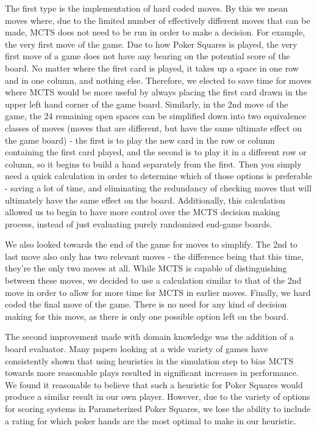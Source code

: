 \documentclass[letterpaper]{article}
\begin{document}
The first type is the implementation of hard coded moves. By this we mean moves where, due to the limited number of effectively different moves that can be made, MCTS does not need to be run in order to make a decision. For example, the very first move of the game. Due to how Poker Squares is played, the very first move of a game does not have any bearing on the potential score of the board. No matter where the first card is played, it takes up a space in one row and in one column, and nothing else. Therefore, we elected to save time for moves where MCTS would be more useful by always placing the first card drawn in the upper left hand corner of the game board.
Similarly, in the 2nd move of the game, the 24 remaining open spaces can be simplified down into two equivalence classes of moves (moves that are different, but have the same ultimate effect on the game board) - the first is to play the new card in the row or column containing the first card played, and the second is to play it in a different row or column, so it begins to build a hand separately from the first. Then you simply need a quick calculation in order to determine which of those options is preferable - saving a lot of time, and eliminating the redundancy of checking moves that will ultimately have the same effect on the board. Additionally, this calculation allowed us to begin to have more control over the MCTS decision making process, instead of just evaluating purely randomized end-game boards.

We also looked towards the end of the game for moves to simplify. The 2nd to last move also only has two relevant moves - the difference being that this time, they’re the only two moves at all. While MCTS is capable of distinguishing between these moves, we decided to use a calculation similar to that of the 2nd move in order to allow for more time for MCTS in earlier moves.
Finally, we hard coded the final move of the game. There is no need for any kind of decision making for this move, as there is only one possible option left on the board.

The second improvement made with domain knowledge was the addition of a board evaluator. Many papers looking at a wide variety of games have consistently shown that using heuristics in the simulation step to bias MCTS towards more reasonable plays resulted in significant increases in performance. We found it reasonable to believe that such a heuristic for Poker Squares would produce a similar result in our own player. However, due to the variety of options for scoring systems in Parameterized Poker Squares, we lose the ability to include a rating for which poker hands are the most optimal to make in our heuristic.
\end{document}
